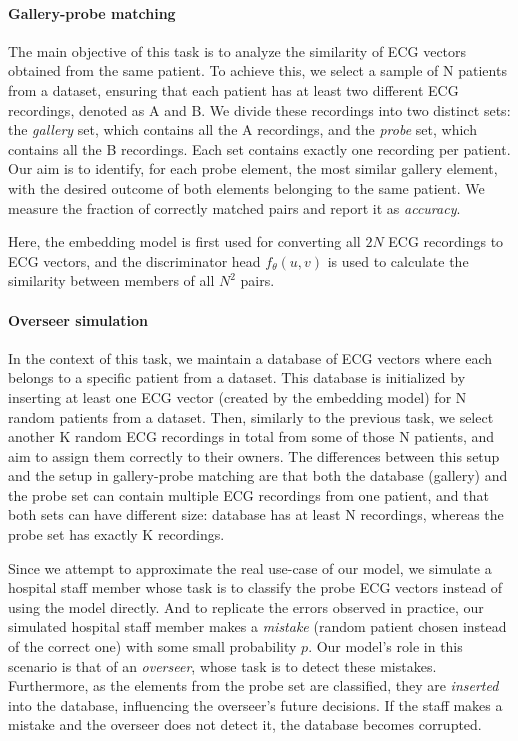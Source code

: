 \documentclass[preprint,12pt]{elsarticle}
\begin{document}
\paragraph{Gallery-probe matching}

The main objective of this task is to analyze the similarity of ECG vectors obtained from the same patient. To achieve this, we select a sample of N patients from a dataset, ensuring that each patient has at least two different ECG recordings, denoted as A and B. We divide these recordings into two distinct sets: the \textit{gallery} set, which contains all the A recordings, and the \textit{probe} set, which contains all the B recordings. Each set contains exactly one recording per patient. Our aim is to identify, for each probe element, the most similar gallery element, with the desired outcome of both elements belonging to the same patient. We measure the fraction of correctly matched pairs and report it as \textit{accuracy}. 

Here, the embedding model is first used for converting all $2N$ ECG recordings to ECG vectors, and the discriminator head $f_\theta(u, v)$ is used to calculate the similarity between members of all $N^2$ pairs.



\paragraph{Overseer simulation}

In the context of this task, we maintain a database of ECG vectors where each belongs to a specific patient from a dataset. This database is initialized by inserting at least one ECG vector (created by the embedding model) for N random patients from a dataset. Then, similarly to the previous task, we select another K random ECG recordings in total from some of those N patients, and aim to assign them correctly to their owners. The differences between this setup and the setup in gallery-probe matching are that both the database (gallery) and the probe set can contain multiple ECG recordings from one patient, and that both sets can have different size: database has at least N recordings, whereas the probe set has exactly K recordings.

Since we attempt to approximate the real use-case of our model, we simulate a hospital staff member whose task is to classify the probe ECG vectors instead of using the model directly. And to replicate the errors observed in practice, our simulated hospital staff member makes a \textit{mistake} (random patient chosen instead of the correct one) with some small probability $p$. Our model's role in this scenario is that of an \textit{overseer}, whose task is to detect these mistakes. Furthermore, as the elements from the probe set are classified, they are \textit{inserted} into the database, influencing the overseer's future decisions. If the staff makes a mistake and the overseer does not detect it, the database becomes corrupted. 
\end{document}
